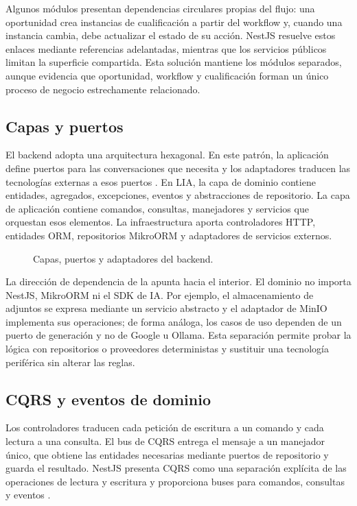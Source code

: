 Algunos módulos presentan dependencias circulares propias del flujo: una
oportunidad crea instancias de cualificación a partir del workflow y, cuando
una instancia cambia, debe actualizar el estado de su acción. NestJS resuelve
estos enlaces mediante referencias adelantadas, mientras que los servicios
públicos limitan la superficie compartida. Esta solución mantiene los módulos
separados, aunque evidencia que oportunidad, workflow y cualificación forman
un único proceso de negocio estrechamente relacionado.

\subsection{Capas y puertos}

El backend adopta una arquitectura hexagonal. En este patrón, la aplicación
define puertos para las conversaciones que necesita y los adaptadores traducen
las tecnologías externas a esos puertos \cite{cockburn2005hexagonal}. En LIA,
la capa de dominio contiene entidades, agregados, excepciones, eventos y
abstracciones de repositorio. La capa de aplicación contiene comandos,
consultas, manejadores y servicios que orquestan esos elementos. La
infraestructura aporta controladores HTTP, entidades ORM, repositorios
MikroORM y adaptadores de servicios externos.

\begin{figure}[htbp]
  \centering
  \resizebox{\textwidth}{!}{
    
  }
  \caption{Capas, puertos y adaptadores del backend.}
  \label{fig:backend-hexagonal}
\end{figure}

La dirección de dependencia de la  apunta hacia el
interior. El dominio no importa NestJS, MikroORM ni el SDK de IA. Por ejemplo,
el almacenamiento de adjuntos se expresa mediante un servicio abstracto y el
adaptador de MinIO implementa sus operaciones; de forma análoga, los casos de
uso dependen de un puerto de generación y no de Google u Ollama. Esta
separación permite probar la lógica con repositorios o proveedores
deterministas y sustituir una tecnología periférica sin alterar las reglas.

\subsection{CQRS y eventos de dominio}

Los controladores traducen cada petición de escritura a un comando y cada
lectura a una consulta. El bus de CQRS entrega el mensaje a un manejador único,
que obtiene las entidades necesarias mediante puertos de repositorio y guarda
el resultado. NestJS presenta CQRS como una separación explícita de las
operaciones de lectura y escritura y proporciona buses para comandos,
consultas y eventos \cite{nestjsCqrs}.


